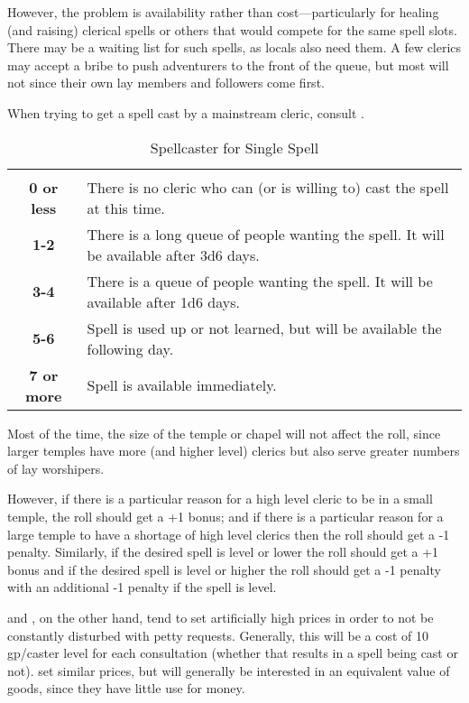 \begin{multicols*}{2}
However, the problem is availability rather than cost—particularly for healing (and raising) clerical spells or others that would compete for the same spell slots. There may be a waiting list for such spells, as locals also need them. A few clerics may accept a bribe to push adventurers to the front of the queue, but most will not since their own lay members and followers come first.

When trying to get a spell cast by a mainstream cleric, consult .

\begin {table}[H]
  \caption{Spellcaster for Single Spell}\label{tab:Spellcaster for Single Spell}
  \begin{tabularx}{\columnwidth}{>{\bfseries}cY}
		 & \\
		0 or less & There is no cleric who can (or is willing to) cast the spell at this time.\\
		1-2 & There is a long queue of people wanting the spell. It will be available after 3d6 days.\\
		3-4 & There is a queue of people wanting the spell. It will be available after 1d6 days.\\
		5-6 & Spell is used up or not learned, but will be available the following day.\\
		7 or more & Spell is available immediately.\
  \end {tabularx}
\end {table}

Most of the time, the size of the temple or chapel will not affect the roll, since larger temples have more (and higher level) clerics but also serve greater numbers of lay worshipers.

However, if there is a particular reason for a high level cleric to be in a small temple, the roll should get a +1 bonus; and if there is a particular reason for a large temple to have a shortage of high level clerics then the roll should get a -1 penalty. Similarly, if the desired spell is  level or lower the roll should get a +1 bonus and if the desired spell is  level or higher the roll should get a -1 penalty with an additional -1 penalty if the spell is  level.

 and , on the other hand, tend to set artificially high prices in order to not be constantly disturbed with petty requests. Generally, this will be a cost of 10 gp/caster level for each consultation (whether that results in a spell being cast or not).  set similar prices, but will generally be interested in an equivalent value of goods, since they have little use for money.


\end{multicols*}
